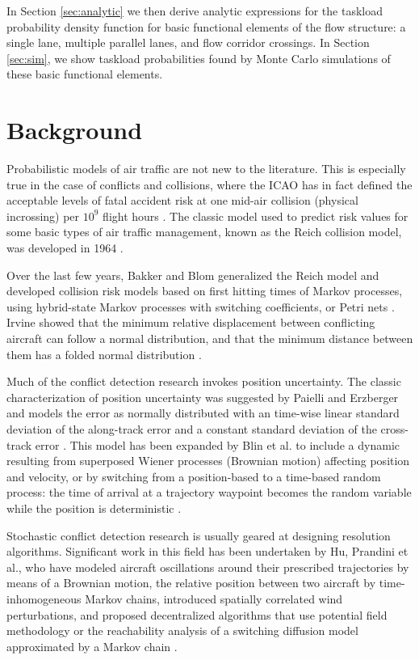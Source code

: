 \documentclass[conference]{IEEEtran}
\begin{document}
In Section \ref{sec:analytic} we then derive analytic expressions for the taskload probability density function for basic functional elements of the flow structure: a single lane, multiple parallel lanes, and flow corridor crossings. In Section \ref{sec:sim}, we show taskload probabilities found by Monte Carlo simulations of these basic functional elements.

\section{Background}

Probabilistic models of air traffic are not new to the literature. This is especially true in the case of conflicts and collisions, where the ICAO has in fact defined the acceptable levels of fatal accident risk at one mid-air collision (physical incrossing) per $10^9$ flight hours \cite{ICAO98}. The classic model used to predict risk values for some basic types of air traffic management, known as the Reich collision model, was developed in 1964 \cite{Rei64}.

Over the last few years, Bakker and Blom generalized the Reich model and developed collision risk models based on first hitting times of Markov processes, using hybrid-state Markov processes with switching coefficients, or Petri nets \cite{Blo06}. Irvine showed that the minimum relative displacement between conflicting aircraft can follow a normal distribution, and that the minimum distance between them has a folded normal distribution \cite{Irv01}.

Much of the conflict detection research invokes position uncertainty. The classic characterization of position uncertainty was suggested by Paielli and Erzberger and models the error as normally distributed with an time-wise linear standard deviation of the along-track error and a constant standard deviation of the cross-track error \cite{PaielliErzberger:1997}. This model has been expanded by Blin et al. to include a dynamic resulting from superposed Wiener processes (Brownian motion) affecting position and velocity, or by switching from a position-based to a time-based random process: the time of arrival at a trajectory waypoint becomes the random variable while the position is deterministic \cite{Blin}.

Stochastic conflict detection research is usually geared at designing resolution algorithms. Significant work in this field has been undertaken by Hu, Prandini et al., who have modeled aircraft oscillations around their prescribed trajectories by means of a Brownian motion, the relative position between two aircraft by time-inhomogeneous Markov chains, introduced spatially correlated wind perturbations, and proposed decentralized algorithms that use potential field methodology or the reachability analysis of a switching diffusion model approximated by a Markov chain \cite{Pra08}. 
\end{document}
